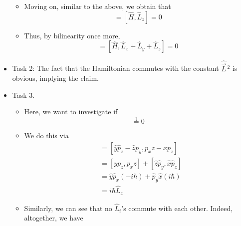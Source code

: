 \documentclass[../notes.tex]{subfiles}
\begin{document}
\begin{itemize}
\begin{itemize}
        \item Moving on, similar to the above, we obtain that
        \begin{equation*}
            [\hat{H},\hat{L}_y] = [\hat{H},\hat{L}_z] = 0
        \end{equation*}
        \item Thus, by bilinearity once more,
        \begin{equation*}
            [\hat{H},\hat{\vec{L}}] = [\hat{H},\hat{L}_x+\hat{L}_y+\hat{L}_z] = 0
        \end{equation*}
    \end{itemize}
    \item Task 2: The fact that the Hamiltonian commutes with the constant $\hat{\vec{L}}{\,}^2$ is obvious, implying the claim.
    \item Task 3.
    \begin{itemize}
        \item Here, we want to investigate if
        \begin{equation*}
            [L_x,L_y] \stackrel{?}{=} 0
        \end{equation*}
        \item We do this via
        \begin{align*}
            [L_x,L_y] &= [\hat{y}\hat{p}_z-\hat{z}p_y,p_xz-xp_z]\\
            &= [yp_z,p_xz]+[\hat{z}\hat{p}_y,\hat{x}\hat{p}_z]\\
            &= \hat{y}\hat{p}_x(-i\hbar)+\hat{p}_y\hat{x}(i\hbar)\\
            &= i\hbar\hat{L}_z
        \end{align*}
        \item Similarly, we can see that no $\hat{L}_i$'s commute with each other. Indeed, altogether, we have
        \begin{align*}

\end{align*}
\end{itemize}
\end{itemize}
\end{document}
